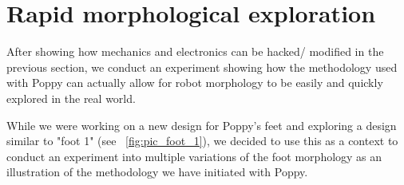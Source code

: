 
\newpage
\section{Rapid morphological exploration} %
\label{sec:morphology-variable}

After showing how mechanics and electronics can be hacked/ modified in the previous section, we conduct an experiment showing how the methodology used with Poppy can actually allow for  robot morphology to be easily and quickly explored in the real world.

While we were working on a new design for Poppy's feet and exploring a design similar to "foot 1" (see \figurename~\ref{fig:pic_foot_1}), we decided to use this as a context to conduct an experiment into multiple variations of the foot morphology as an illustration of the methodology we have initiated with Poppy.

\begin{figure}[!b]
\centering
    \hfil
    \\
    \hfil
    \caption{}
    \label{fig:foot_variants}
\end{figure}


